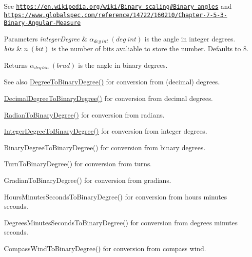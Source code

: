 See \href{https://en.wikipedia.org/wiki/Binary_scaling#Binary_angles}{\tt https\+://en.\+wikipedia.\+org/wiki/\+Binary\+\_\+scaling\#\+Binary\+\_\+angles} and \href{https://www.globalspec.com/reference/14722/160210/Chapter-7-5-3-Binary-Angular-Measure}{\tt https\+://www.\+globalspec.\+com/reference/14722/160210/\+Chapter-\/7-\/5-\/3-\/\+Binary-\/\+Angular-\/\+Measure} 
\begin{DoxyParams}{Parameters}
{\em integer\+Degree} & $\alpha_{deg\ int}\ (deg\ int)$ is the angle in integer degrees. \\
\hline
{\em bits} & $n\ (bit)$ is the number of bits avaliable to store the number. Defaults to 8. \\
\hline
\end{DoxyParams}
\begin{DoxyReturn}{Returns}
$\alpha_{deg\ bin}\ (brad)$ is the angle in binary degrees. 
\end{DoxyReturn}
\begin{DoxySeeAlso}{See also}
\mbox{\hyperlink{group___e_g_x_math-_angle_conversions-_degree_gacd1e3dc5194e89426a899a7cac4874f8}{Degree\+To\+Binary\+Degree()}} for conversion from (decimal) degrees. 

\mbox{\hyperlink{group___e_g_x_math-_angle_conversions-_decimal_degree_gaceec7ae7988c7f342d0b0fa6940720a1}{Decimal\+Degree\+To\+Binary\+Degree()}} for conversion from decimal degrees. 

\mbox{\hyperlink{group___e_g_x_math-_angle_conversions-_radian_ga13311d9b6977d514f1d6c336e7c0162b}{Radian\+To\+Binary\+Degree()}} for conversion from radians. 

\mbox{\hyperlink{group___e_g_x_math-_angle_conversions-_integer_degree_ga694bbfe624c3c14e97ce6155ca9bc44d}{Integer\+Degree\+To\+Binary\+Degree()}} for conversion from integer degrees. 

Binary\+Degree\+To\+Binary\+Degree() for conversion from binary degrees. 

Turn\+To\+Binary\+Degree() for conversion from turns. 

Gradian\+To\+Binary\+Degree() for conversion from gradians. 

Hours\+Minutes\+Seconds\+To\+Binary\+Degree() for conversion from hours minutes seconds. 

Degrees\+Minutes\+Seconds\+To\+Binary\+Degree() for conversion from degrees minutes seconds. 

Compass\+Wind\+To\+Binary\+Degree() for conversion from compass wind. 
\end{DoxySeeAlso}
\mbox{\label{group___e_g_x_math-_angle_conversions-_integer_degree_ga01abeefd29282a3c88d3d3c28fd2c6fa}} 
